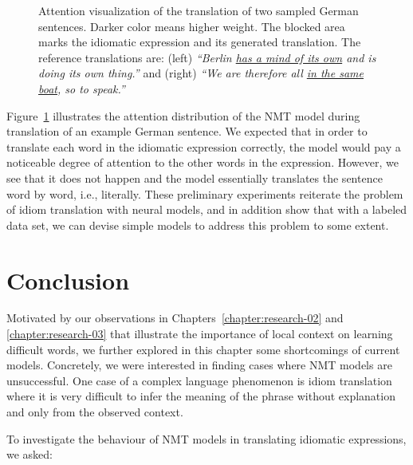 \begin{figure}[ht!]
\begin{subfigure}[h]{0.495\textwidth}
\end{subfigure}
\caption{Attention visualization of the translation of two sampled German sentences. Darker color means higher weight. The blocked area marks the idiomatic expression and its generated translation. The reference translations are: (left) \textit{``Berlin \underline{has a mind of its own} and is doing its own thing.''} and (right) \textit{``We are therefore all \underline{in the same boat}, so to speak.''} \label{att2}}
\end{figure}


Figure~\ref{att2} illustrates the attention distribution of the NMT model during translation of an example German sentence. 
We expected that in order to translate each word in the idiomatic expression correctly, the model would pay a noticeable degree of attention to the other words in the expression. 
However, we see that it does not happen and the model essentially translates the sentence word by word, i.e., literally. 
%
These preliminary experiments reiterate the problem of idiom translation with neural models, and in addition show that with a labeled data set, we can devise simple models to address this problem to some extent.


\section{Conclusion} \label{idconc}


Motivated by our observations in Chapters~\ref{chapter:research-02} and \ref{chapter:research-03} that illustrate the importance of local context on learning difficult words, we further explored in this chapter some shortcomings of current models.
Concretely, we were interested in finding cases where NMT models are unsuccessful.
One case of a complex language phenomenon is idiom translation where it is very difficult to infer the meaning of the phrase without explanation and only from the observed context.

To investigate the behaviour of NMT models in translating idiomatic expressions, we asked:

